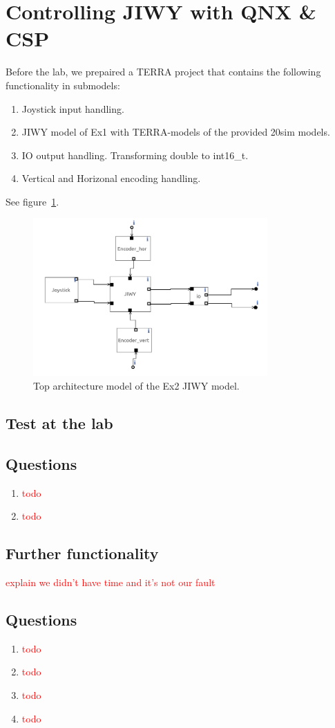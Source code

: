 \documentclass[a4paper,twoside,11pt]{article}
\newcommand{\todo}[1]{{\Large\sc\textcolor{red}{#1}}}
\begin{document}
\newpage

\section{Controlling JIWY with QNX \& CSP}
Before the lab, we prepaired a TERRA project that contains the following functionality in submodels:
\begin{enumerate}
	\item Joystick input handling.
	\item JIWY model of Ex1 with TERRA-models of the provided 20sim models.
	\item IO output handling. Transforming double to int16\_t.
	\item Vertical and Horizonal encoding handling.
\end{enumerate}
See figure~\ref{fig:jiwy-overview}.
\begin{figure}
 \centering
 \includegraphics[width=0.8\textwidth]{./img/jiwy-overview.png}
 \caption{Top architecture model of the Ex2 JIWY model.}
 \label{fig:jiwy-overview}
\end{figure}
\subsection{Test at the lab}

\subsection{Questions}
\begin{enumerate}
 \item \todo{todo}
 \item \todo{todo}
\end{enumerate}

\subsection{Further functionality}
\todo{explain we didn't have time and it's not our fault}

\subsection{Questions}
\begin{enumerate}
 \item \todo{todo}
 \item \todo{todo}
 \item \todo{todo}
 \item \todo{todo}
\end{enumerate}
\end{document}
